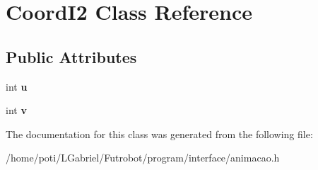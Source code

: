 \hypertarget{classCoordI2}{}\section{Coord\+I2 Class Reference}
\label{classCoordI2}
\subsection*{Public Attributes}
\begin{DoxyCompactItemize}
\item 
int {\bfseries u}\hypertarget{classCoordI2_a5943453ae208fe1ec02e64b59a8014a5}{}\label{classCoordI2_a5943453ae208fe1ec02e64b59a8014a5}

\item 
int {\bfseries v}\hypertarget{classCoordI2_ab4075aba5007a9fd387e7abd9dd27b24}{}\label{classCoordI2_ab4075aba5007a9fd387e7abd9dd27b24}

\end{DoxyCompactItemize}


The documentation for this class was generated from the following file\+:\begin{DoxyCompactItemize}
\item 
/home/poti/\+L\+Gabriel/\+Futrobot/program/interface/animacao.\+h\end{DoxyCompactItemize}
